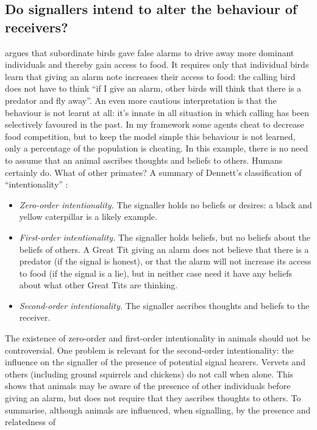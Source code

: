 \subsection{Do signallers intend to alter the behaviour of receivers? \label{TheoryOfMind}}
\citet{Moller1998:FalseAlarmCalls} argues that subordinate birds gave false alarms to drive away more dominant
individuals and thereby gain access to food. It requires only that individual birds learn that
giving an alarm note increases their access to food: the calling bird does not
have to think ``if I give an alarm, other birds will think that there is a predator and fly away''.
An even more cautious interpretation is that the behaviour is not learnt at all:
it's innate in all situation in which calling has been selectively favoured in the past.
In my framework some agents cheat to decrease food competition, but to keep the model
simple this behaviour is not learned, only a percentage of the population is
cheating. In this example,
there is no need to assume that an animal ascribes thoughts and beliefs to others.
Humans certainly do. What of other primates?
A summary of Dennett's classification of ``intentionality'' \citep{Dennett1987:Intentional}:
\begin{itemize}
 \item \textit{Zero-order intentionality.} The signaller holds no beliefs or desires:
 a black and yellow caterpillar is a likely example.
 \item \textit{First-order intentionality.} The signaller holds beliefs,
but no beliefs about the beliefs of others.
A Great Tit giving an alarm does not believe that there is a predator (if the signal is honest),
or that the alarm will not increase its access to food (if the signal is a lie),
but in neither case need it have any beliefs about what other Great Tits are thinking.
 \item \textit{Second-order intentionality.}  The signaller ascribes thoughts and beliefs to the receiver.
\end{itemize}
The existence of zero-order and first-order intentionality in animals
should not be controversial. One problem is relevant for the second-order intentionality:
the influence on the signaller of the presence of potential signal hearers.
Vervets and others (including ground squirrels and chickens) do not call when alone.
This shows that animals may be aware of the presence of other individuals before giving an
alarm, but does not require that they ascribes thoughts to others. To summarise,
although animals are influenced, when signalling, by the presence and relatedness of
